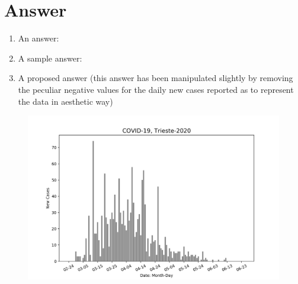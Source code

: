 \documentclass[10pt,a4paper]{article}
\begin{document}
\section{Answer}
\begin{enumerate}
\item An answer: \\  %

\item A sample answer: \\

\item A proposed answer (this answer has been manipulated slightly by removing the peculiar negative values for the daily new cases reported  as to represent the data in aesthetic way)

\end{enumerate}
\begin{figure}[htbp]\centering
\includegraphics[width=1.0\textwidth]{daily_cases_trieste.png}
\end{figure}



\end{document}
